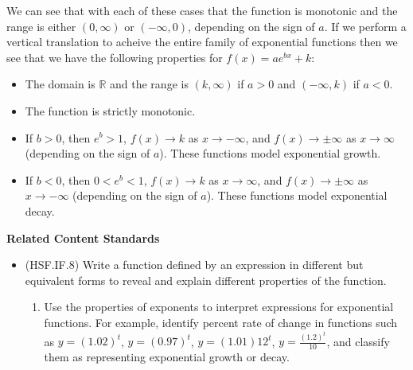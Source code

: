 \documentclass[
]{book}
\providecommand{\tightlist}{%
  \setlength{\itemsep}{0pt}\setlength{\parskip}{0pt}}
\newenvironment{standards}{}{}
\theoremstyle{definition}
\theoremstyle{definition}
\theoremstyle{definition}
\theoremstyle{definition}
\theoremstyle{remark}
\begin{document}
We can see that with each of these cases that the function is monotonic and the range is either \((0,\infty)\) or \((-\infty,0)\), depending on the sign of \(a\). If we perform a vertical translation to acheive the entire family of exponential functions then we see that we have the following properties for \(f(x) = a e^{bx} +k\):

\begin{itemize}
\tightlist
\item
  The domain is \(\mathbb{R}\) and the range is \((k,\infty)\) if \(a>0\) and \((-\infty,k)\) if \(a<0\).
\item
  The function is strictly monotonic.
\item
  If \(b>0\), then \(e^b>1\), \(f(x)\rightarrow k\) as \(x\rightarrow -\infty\), and \(f(x) \rightarrow \pm \infty\) as \(x\rightarrow \infty\) (depending on the sign of \(a\)). These functions model exponential growth.
\item
  If \(b<0\), then \(0<e^b<1\), \(f(x)\rightarrow k\) as \(x \rightarrow \infty\), and \(f(x) \rightarrow \pm \infty\) as \(x\rightarrow -\infty\) (depending on the sign of \(a\)). These functions model exponential decay.
\end{itemize}

\begin{standards}

\begin{center}
\textbf{Related Content Standards}

\end{center}

\begin{itemize}
\tightlist
\item
  (HSF.IF.8) Write a function defined by an expression in different but equivalent forms to reveal and explain different properties of the function.

  \begin{enumerate}
  \def\labelenumi{\alph{enumi}.}
  \setcounter{enumi}{1}
  \tightlist
  \item
    Use the properties of exponents to interpret expressions for exponential functions. For example, identify percent rate of change in functions such as \(y=(1.02)^t\), \(y = (0.97)^t\), \(y = (1.01)12^t\), \(y = \frac{(1.2)^t}{10}\), and classify them as representing exponential growth or decay.
  \end{enumerate}
\end{itemize}

\end{standards}
\end{document}
